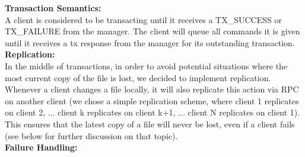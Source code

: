\documentclass[11pt]{article}
\begin{document}
\textbf{Transaction Semantics:} \\

A client is considered to be transacting until it receives a TX\_SUCCESS or TX\_FAILURE from the manager.
The client will queue all commands it is given until it receives a tx response from the manager for its outstanding transaction. \\

\textbf{Replication:} \\

In the middle of transactions, in order to avoid potential situations where the most current copy of the file is lost, we decided to implement replication. Whenever a client changes a file locally,
it will also replicate this action via RPC on another client (we chose a simple replication scheme, where client 1 replicates on client 2, ... client k replicates on client k+1, ... client N replicates on client 1).
This ensures that the latest copy of a file will never be lost, even if a client fails (see below for further discussion on that topic). \\

\textbf{Failure Handling:} \\
\end{document}

